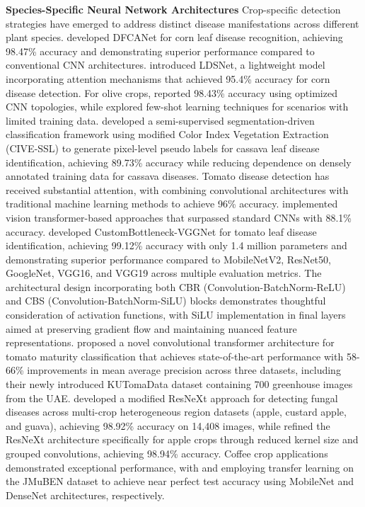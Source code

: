 \documentclass[sn-mathphys]{sn-jnl}
\theoremstyle{thmstyleone}%
\theoremstyle{thmstyletwo}%
\theoremstyle{thmstylethree}%
\begin{document}
\textbf{Species-Specific Neural Network Architectures}
Crop-specific detection strategies have emerged to address distinct disease manifestations across different plant species. \citet{chen2022dfcanet} developed DFCANet for corn leaf disease recognition, achieving 98.47\% accuracy and demonstrating superior performance compared to conventional CNN architectures. \citet{zeng2022lightweight} introduced LDSNet, a lightweight model incorporating attention mechanisms that achieved 95.4\% accuracy for corn disease detection. For olive crops, \citet{lachgar2022optimization} reported 98.43\% accuracy using optimized CNN topologies, while \citet{lin2022few} explored few-shot learning techniques for scenarios with limited training data. \citet{divya_cassava} developed a semi-supervised segmentation-driven classification framework using modified Color Index Vegetation Extraction (CIVE-SSL) to generate pixel-level pseudo labels for cassava leaf disease identification, achieving 89.73\% accuracy while reducing dependence on densely annotated training data for cassava diseases.
Tomato disease detection has received substantial attention, with \citet{sahu2023classification} combining convolutional architectures with traditional machine learning methods to achieve 96\% accuracy. \citet{wu2021multi} implemented vision transformer-based approaches that surpassed standard CNNs with 88.1\% accuracy. \citet{zarboubi2025custombottleneck} developed CustomBottleneck-VGGNet for tomato leaf disease identification, achieving 99.12\% accuracy with only 1.4 million parameters and demonstrating superior performance compared to MobileNetV2, ResNet50, GoogleNet, VGG16, and VGG19 across multiple evaluation metrics. The architectural design incorporating both CBR (Convolution-BatchNorm-ReLU) and CBS (Convolution-BatchNorm-SiLU) blocks demonstrates thoughtful consideration of activation functions, with SiLU implementation in final layers aimed at preserving gradient flow and maintaining nuanced feature representations. \citet{khan2023tomato} proposed a novel convolutional transformer architecture for tomato maturity classification that achieves state-of-the-art performance with 58-66\% improvements in mean average precision across three datasets, including their newly introduced KUTomaData dataset containing 700 greenhouse images from the UAE. \citet{upadhyay2024detecting} developed a modified ResNeXt approach for detecting fungal diseases across multi-crop heterogeneous region datasets (apple, custard apple, and guava), achieving 98.92\% accuracy on 14,408 images, while \citet{upadhyay2024diagnosis} refined the ResNeXt architecture specifically for apple crops through reduced kernel size and grouped convolutions, achieving 98.94\% accuracy. Coffee crop applications demonstrated exceptional performance, with \citet{sharma2023coffee} and \citet{aufar2023web} employing transfer learning on the JMuBEN dataset to achieve near perfect test accuracy using MobileNet and DenseNet architectures, respectively. 
\end{document}
